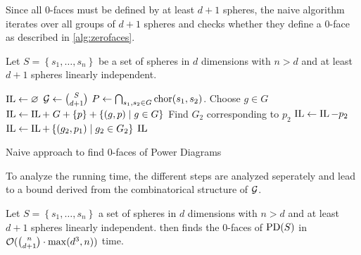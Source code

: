 Since all $0$-faces must be defined by at least $d+1$ spheres, the naive algorithm iterates over all groups of $d+1$ spheres and checks whether they define a $0$-face as described in \cref{alg:zerofaces}.
\begin{algorithm}
    Let $S = \left\{ s_1, \dots, s_n \right\}$ be a set of spheres in $d$ dimensions with $n > d$ and at least $d+1$ spheres linearly independent.

    \begin{algorithmic}[1]
            \State $\operatorname{IL} \gets \varnothing$
            \State $\mathcal{G} \gets \binom{S}{d + 1}$
            \Statex
                \State $P \gets \bigcap_{s_1, s_2 \in G} \operatorname{chor}(s_1, s_2)$.
                    \State Choose $g \in G$
                        \State $\operatorname{IL} \gets \operatorname{IL} +\; G + \left\{ p \right\} + \left\{ (g, p) \mid g \in G \right\}$
                    \EndIf
                \EndIf
            \EndFor
            \Statex
                    \State Find $G_2$ corresponding to $p_2$
                    \State $\operatorname{IL} \gets \operatorname{IL} - p_2$
                    \State $\operatorname{IL} \gets \operatorname{IL} + \left\{ (g_2, p_1) \mid g_2 \in G_2 \right\}$
                \EndIf
            \EndFor
            \State \Return $\operatorname{IL}$
        \EndFunction
    \end{algorithmic}
    \caption{Naive approach to find $0$-faces of Power Diagrams}
    \label{alg:zerofaces}
\end{algorithm}
To analyze the running time, the different steps are analyzed seperately and lead to a bound derived from the combinatorical structure of $\mathcal{G}$.
\begin{theorem}
    Let $S = \left\{ s_1, \dots, s_n \right\}$ a set of spheres in $d$ dimensions with $n > d$ and at least $d + 1$ spheres linearly independent.
     then finds the $0$-faces of $\operatorname{PD}(S)$ in $\mathcal{O}(\binom{n}{d + 1} \cdot \max(d^3, n))$ time.
\end{theorem}
